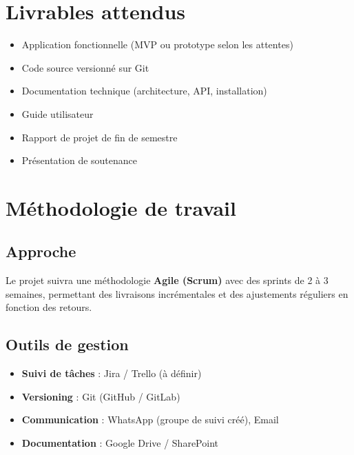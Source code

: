 \documentclass[12pt,a4paper]{article}
\begin{document}
\section{Livrables attendus}

\begin{itemize}[leftmargin=2cm, itemsep=4pt]
    \item[\textcolor{secondary}{\checkmark}] Application fonctionnelle (MVP ou prototype selon les attentes)
    \item[\textcolor{secondary}{\checkmark}] Code source versionn\'e sur Git
    \item[\textcolor{secondary}{\checkmark}] Documentation technique (architecture, API, installation)
    \item[\textcolor{secondary}{\checkmark}] Guide utilisateur
    \item[\textcolor{secondary}{\checkmark}] Rapport de projet de fin de semestre
    \item[\textcolor{secondary}{\checkmark}] Pr\'esentation de soutenance
\end{itemize}

\section{M\'ethodologie de travail}

\subsection{Approche}
Le projet suivra une m\'ethodologie \textbf{Agile (Scrum)} avec des sprints de 2 \`a 3 semaines, permettant des livraisons incr\'ementales et des ajustements r\'eguliers en fonction des retours.

\subsection{Outils de gestion}
\begin{itemize}[leftmargin=2cm, itemsep=3pt]
    \item[\textcolor{accent}{$\blacktriangleright$}] \textbf{Suivi de t\^aches} : Jira / Trello (\`a d\'efinir)
    \item[\textcolor{accent}{$\blacktriangleright$}] \textbf{Versioning} : Git (GitHub / GitLab)
    \item[\textcolor{accent}{$\blacktriangleright$}] \textbf{Communication} : WhatsApp (groupe de suivi cr\'e\'e), Email
    \item[\textcolor{accent}{$\blacktriangleright$}] \textbf{Documentation} : Google Drive / SharePoint
\end{itemize}
\end{document}
